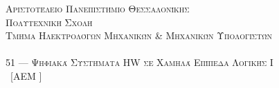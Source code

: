 \begin{center}
	\noindent\textsc{{Αριστοτέλειο Πανεπιστήμιο Θεσσαλονίκης}}\\
	\noindent\textsc{{Πολυτεχνική Σχολή}}\\
	\noindent\textsc{{Τμήμα Ηλεκτρολόγων Μηχανικών	\& Μηχανικών Υπολογιστών}}\\[10pt]
	\\
	\noindent\textsc{{51 --- Ψηφιακά Συστήματα HW σε Χαμηλά Επίπεδα Λογικής I}}\\[8pt]
	\noindent\small{\authorOne~[AEM \aemOne]}\\
	\\[8pt]
\end{center}
